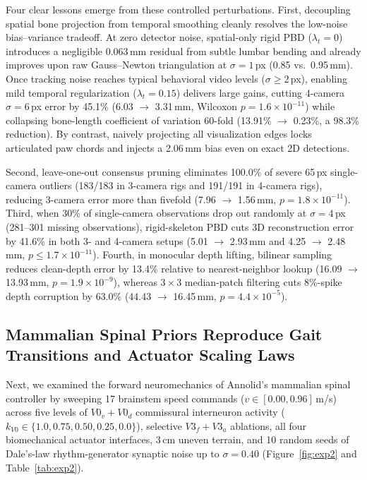 \documentclass[10pt,twocolumn,letterpaper]{article}
\begin{document}
Four clear lessons emerge from these controlled perturbations. First, decoupling spatial bone projection from temporal smoothing cleanly resolves the low-noise bias--variance tradeoff. At zero detector noise, spatial-only rigid PBD ($\lambda_t=0$) introduces a negligible 0.063\,mm residual from subtle lumbar bending and already improves upon raw Gauss--Newton triangulation at $\sigma=1$\,px (0.85 vs.\ 0.95\,mm). Once tracking noise reaches typical behavioral video levels ($\sigma \ge 2$\,px), enabling mild temporal regularization ($\lambda_t=0.15$) delivers large gains, cutting 4-camera $\sigma=6$\,px error by 45.1\% (6.03 $\to$ 3.31\,mm, Wilcoxon $p=1.6\times 10^{-11}$) while collapsing bone-length coefficient of variation 60-fold (13.91\% $\to$ 0.23\%, a 98.3\% reduction). By contrast, naively projecting all visualization edges locks articulated paw chords and injects a 2.06\,mm bias even on exact 2D detections.

Second, leave-one-out consensus pruning eliminates 100.0\% of severe 65\,px single-camera outliers (183/183 in 3-camera rigs and 191/191 in 4-camera rigs), reducing 3-camera error more than fivefold (7.96 $\to$ 1.56\,mm, $p=1.8\times 10^{-11}$). Third, when 30\% of single-camera observations drop out randomly at $\sigma=4$\,px (281--301 missing observations), rigid-skeleton PBD cuts 3D reconstruction error by 41.6\% in both 3- and 4-camera setups (5.01 $\to$ 2.93\,mm and 4.25 $\to$ 2.48\,mm, $p \le 1.7\times 10^{-11}$). Fourth, in monocular depth lifting, bilinear sampling reduces clean-depth error by 13.4\% relative to nearest-neighbor lookup (16.09 $\to$ 13.93\,mm, $p=1.9\times 10^{-9}$), whereas $3\times 3$ median-patch filtering cuts 8\%-spike depth corruption by 63.0\% (44.43 $\to$ 16.45\,mm, $p=4.4\times 10^{-5}$).

\subsection{Mammalian Spinal Priors Reproduce Gait Transitions and Actuator Scaling Laws}

Next, we examined the forward neuromechanics of Annolid's mammalian spinal controller by sweeping 17 brainstem speed commands ($v \in [0.00, 0.96]$\,m/s) across five levels of $V0_v{+}V0_d$ commissural interneuron activity ($k_{V0} \in \{1.0, 0.75, 0.50, 0.25, 0.0\}$), selective $V3_f{+}V3_a$ ablations, all four biomechanical actuator interfaces, 3\,cm uneven terrain, and 10 random seeds of Dale's-law rhythm-generator synaptic noise up to $\sigma = 0.40$ (Figure~\ref{fig:exp2} and Table~\ref{tab:exp2}).
\end{document}
